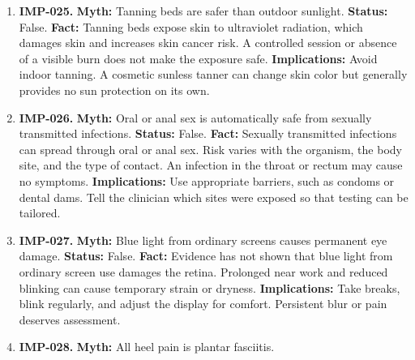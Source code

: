 \documentclass[11pt,oneside]{book}
\begin{document}
\begin{enumerate}[leftmargin=0pt,labelwidth=0pt,labelsep=0pt,itemindent=0pt]
\textbf{Status:} False.\newline
\textbf{Fact:} Vaccine protection and infection risks change over a lifetime. Adults may need boosters, missed childhood doses, or vaccines recommended for their age, pregnancy, medical condition, or exposure. \cite{ref66}\newline
\textbf{Implications:} Review your vaccination record against the local adult schedule with a clinician or pharmacist.
\item[] \textbf{IMP-025.} \textbf{Myth:} Tanning beds are safer than outdoor sunlight.\newline
\textbf{Status:} False.\newline
\textbf{Fact:} Tanning beds expose skin to ultraviolet radiation, which damages skin and increases skin cancer risk. A controlled session or absence of a visible burn does not make the exposure safe. \cite{ref104,ref319}\newline
\textbf{Implications:} Avoid indoor tanning. A cosmetic sunless tanner can change skin color but generally provides no sun protection on its own.
\item[] \textbf{IMP-026.} \textbf{Myth:} Oral or anal sex is automatically safe from sexually transmitted infections.\newline
\textbf{Status:} False.\newline
\textbf{Fact:} Sexually transmitted infections can spread through oral or anal sex. Risk varies with the organism, the body site, and the type of contact. An infection in the throat or rectum may cause no symptoms. \cite{ref407}\newline
\textbf{Implications:} Use appropriate barriers, such as condoms or dental dams. Tell the clinician which sites were exposed so that testing can be tailored.
\item[] \textbf{IMP-027.} \textbf{Myth:} Blue light from ordinary screens causes permanent eye damage.\newline
\textbf{Status:} False.\newline
\textbf{Fact:} Evidence has not shown that blue light from ordinary screen use damages the retina. Prolonged near work and reduced blinking can cause temporary strain or dryness. \cite{ref408}\newline
\textbf{Implications:} Take breaks, blink regularly, and adjust the display for comfort. Persistent blur or pain deserves assessment.
\item[] \textbf{IMP-028.} \textbf{Myth:} All heel pain is plantar fasciitis.\newline

\end{enumerate}
\end{document}
